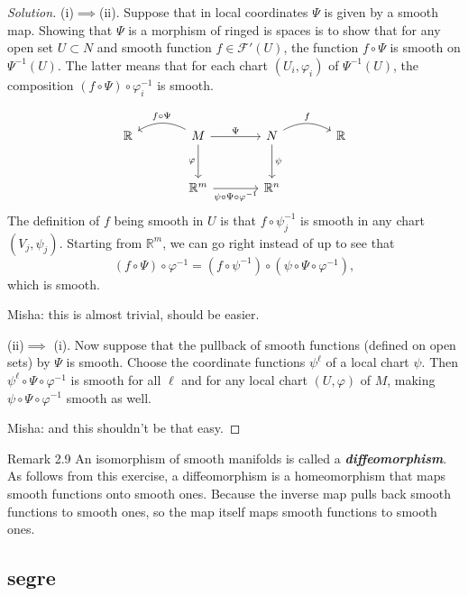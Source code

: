 \begin{proof}[Solution]\leavevmode
(i)$\implies $(ii). Suppose that in local coordinates $\Psi$ is given by a smooth map. Showing that $\Psi$ is a morphism of ringed is spaces is to show that for any open set $U \subset N$ and smooth function $f \in\mathcal{F}'(U)$, the function $f \circ \Psi$ is smooth on $\Psi^{-1}(U)$. The latter means that for each chart $(U_i,\varphi_i)$ of $\Psi^{-1}(U)$, the composition  $(f \circ\Psi)\circ \varphi_i^{-1}$ is smooth.

\[\begin{tikzcd}[column sep=large,row sep=large]
	\mathbb{R}&M\arrow[r,"\Psi"]\arrow[d,swap,"\varphi"]\arrow[l,swap,"f \circ \Psi",bend right]& N\arrow[d,"\psi"]\arrow[r,"f",bend left]&\mathbb{R}\\
	&\mathbb{R}^m\arrow[r,"\psi\circ\Psi\circ \varphi^{-1}",swap]&\mathbb{R}^n
\end{tikzcd}\]
The definition of $f$ being smooth in $U$ is that  $f \circ \psi^{-1}_j$ is smooth in any chart $(V_j,\psi_j)$. Starting from $\mathbb{R}^m$, we can go right instead of up to see that
\[(f \circ \Psi)\circ \varphi^{-1}=(f \circ \psi^{-1}) \circ (\psi \circ \Psi \circ\varphi^{-1}),\]
which is smooth.

{\color{2}Misha: this is almost trivial, should be easier.}

(ii)$\implies $ (i). Now suppose that the pullback of smooth functions (defined on open sets) by $\Psi$ is smooth. Choose the coordinate functions $\psi^\ell$ of a local chart $\psi$. Then $\psi^\ell \circ \Psi \circ \varphi^{-1}$ is smooth for all $\ell$ and for any local chart $(U,\varphi)$ of $M$, making $\psi \circ \Psi \circ \varphi^{-1}$ smooth as well.

{\color{2}Misha: and this shouldn't be that easy.}
\end{proof}

\begin{thing5}{Remark 2.9}\label{rk:2.9}\leavevmode
An isomorphism of smooth manifolds is called a \textit{\textbf{diffeomorphism}}. As follows from this exercise, a diffeomorphism is a homeomorphism that maps smooth functions onto smooth ones. {\color{14}Because the inverse map pulls back smooth functions to smooth ones, so the map itself maps smooth functions to smooth ones.}
\end{thing5}

\subsection{segre}

